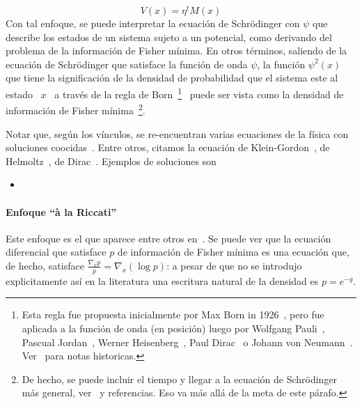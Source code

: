 %
\[
V(x) =  \eta^t M(x)
\]
%
Con tal enfoque, se puede interpretar  la ecuaci\'on de Schr\"odinger con $\psi$
que describe los estados de un sistema sujeto a un potencial, como derivando del
problema de la informaci\'on de  Fisher m\'inima.  En otros t\'erminos, saliendo
de la ecuaci\'on de Schr\"odinger que  satisface la funci\'on de onda $\psi$, la
funci\'on  $\psi^2(x)$   que  tiene  la   significaci\'on  de  la   densidad  de
probabilidad que  el sistema este al  estado \ $x$ \  a trav\'es de la  regla de
Born~\footnote{Esta   regla  fue   propuesta  inicialmente   por  Max   Born  in
1926~\cite{Bor26,  Omn94},  pero  fue  aplicada  a  la  funci\'on  de  onda  (en
posici\'on)     luego      por     Wolfgang      Pauli~\cite{Pau27},     Pascual
Jordan~\cite{Jor27:09,    Jor27:11},   Werner    Heisenberg~\cite{Hei27},   Paul
Dirac~\cite{Dir27} o Johann  von Neumann~\cite{Neu32}.  Ver~\cite{MehRec00} para
notas   historicas.}~\cite{Bor26}  puede   ser   vista  como   la  densidad   de
informaci\'on de Fisher m\'inima~\footnote{De hecho,  se puede incluir el tiempo
y llegar a la ecuaci\'on de Schr\"odinger m\'as general, ver~\cite{Fri98, Fri04}
y referencias.  Eso va m\'as all\'a de la meta de este p\'arafo.}.

Notar  que, seg\'un  los v\'inculos,  se re-encuentran  varias ecuaciones  de la
f\'isica con  soluciones coocidas~\cite{Fri98, Fri04}.  Entre  otros, citamos la
ecuaci\'on   de   Klein-Gordon~\cite{Fri90,    FriSof95,   Fri98,   Fri04},   de
Helmoltz~\cite{Fri90, FriSof95,  Fri98, Fri04}, de  Dirac~\cite{FriSof95, Fri98,
Fri04}. Ejemplos de soluciones son
%
\begin{itemize}
\item {}
\end{itemize}


\paragraph{Enfoque ``\`a la Riccati''}

Este enfoque es  el que aparece entre otros  en~\cite{BorLew96, BorLew95, Ziv98,
FriPla99}.  Se puede  ver que  la ecuaci\'on  diferencial que  satisface $p$  de
informaci\'on  de Fisher  m\'inima es  una ecuaci\'on  que, de  hecho, satisface
$\frac{\nabla_x p}{p} =  \nabla_x \left( \log p  \right)$: a pesar de  que no se
introdujo  explicitamente as\'i  en la  literatura una  escritura natural  de la
densidad es $p = e^{ - g}$.
%

